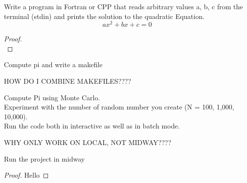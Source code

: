 \documentclass[12pt]{article}
\newenvironment{problem}[2][Problem]{\begin{trivlist}
\item[\hskip \labelsep {\bfseries #1}\hskip \labelsep {\bfseries #2.}]}{\end{trivlist}}
\begin{document}
\newpage
\begin{problem}{3}
Write a program in Fortran or CPP that reads arbitrary values a, b, c from the terminal (stdin) and prints the solution to the quadratic Equation.\\
$$ax^2 + bx + c=0$$
\end{problem}
\begin{proof}~\\

\end{proof}
\newpage
\begin{problem}{4}
Compute pi and write a makefile
\end{problem}


{\huge HOW DO I COMBINE MAKEFILES????}


\begin{problem}{5}
Compute Pi using Monte Carlo. \\
Experiment with the number of random number you create (N = 100, 1,000, 10,000).\\
Run the code both in interactive as well as in batch mode.
\end{problem}

{\huge WHY ONLY WORK ON LOCAL, NOT MIDWAY????}


\begin{problem}{6}
Run the project in midway
\end{problem}
\begin{proof}
Hello
\end{proof}
\end{document}
